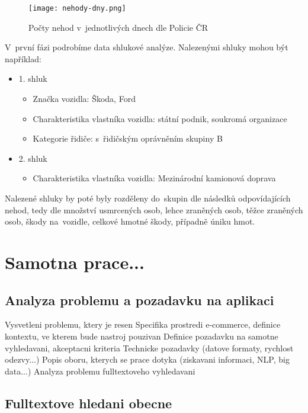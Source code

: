 \documentclass[FM,DP]{tulthesis}
\begin{document}
\begin{figure}[h]
\center
\texttt{[image: nehody-dny.png]}
\caption{Počty nehod v~jednotlivých dnech dle Policie ČR}
\label{foto}
\end{figure}

V~první fázi podrobíme data shlukové analýze. Nalezenými shluky mohou být například:

\begin{itemize}
\item 1. shluk
\begin{itemize}
\item Značka vozidla: Škoda, Ford
\item Charakteristika vlastníka vozidla: státní podnik, soukromá organizace
\item Kategorie řidiče: s~řidičským oprávněním skupiny B
\end{itemize}
\item 2. shluk
\begin{itemize}
\item Charakteristika vlastníka vozidla: Mezinárodní kamionová doprava
\end{itemize}
\end{itemize}

Nalezené shluky by poté byly rozděleny do~skupin dle následků odpovídajících nehod, tedy dle množství usmrcených osob, lehce zraněných osob, těžce zraněných osob, škody na~vozidle, celkové hmotné škody, případně úniku hmot.


\chapter{Samotna prace...}

\section{Analyza problemu a pozadavku na aplikaci}

Vysvetleni problemu, ktery je resen
Specifika prostredi e-commerce, definice kontextu, ve kterem bude nastroj pouzivan
Definice pozadavku na samotne vyhledavani, akceptacni kriteria
Technicke pozadavky (datove formaty, rychlost odezvy...)
Popis oboru, kterych se prace dotyka (ziskavani informaci, NLP, big data...)
Analyza problemu fulltextoveho vyhledavani

\section{Fulltextove hledani obecne}
\end{document}
